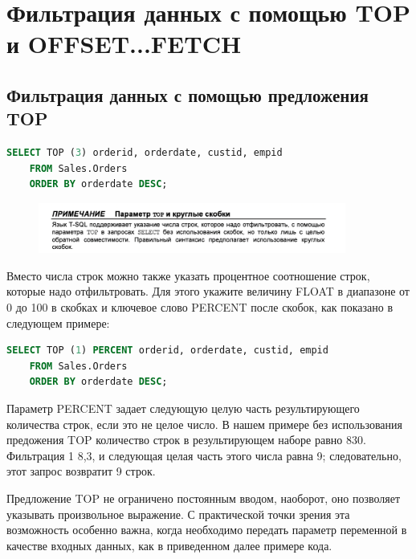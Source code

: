 \section{Фильтрация данных с помощью TOP и OFFSET...FETCH} 

\subsection{Фильтрация данных с помощью предложения TOP}

\begin{lstlisting}[label=lst:funcReturn, caption=Пример работы с TOP, language=sql]
	SELECT TOP (3) orderid, orderdate, custid, empid
	FROM Sales.Orders
	ORDER BY orderdate DESC; 
\end{lstlisting}



\begin{figure}[h!]
	\begin{center}
		\includegraphics[width=0.9\textwidth]{img/advice6.png}
	\end{center}
	\captionsetup{justification=centering}
\end{figure}

Вместо числа строк можно также указать процентное соотношение строк, которые
надо отфильтровать. Для этого укажите величину FLOAT в диапазоне от 0 до 100
в скобках и ключевое слово PERCENT после скобок, как показано в следующем примере:


\begin{lstlisting}[label=lst:funcReturn, language=sql]
	SELECT TOP (1) PERCENT orderid, orderdate, custid, empid
	FROM Sales.Orders
	ORDER BY orderdate DESC; 
\end{lstlisting}

Параметр PERCENT задает следующую целую часть результирующего количества
строк, если это не целое число. В нашем примере без использования предожения
TOP количество строк в результирующем наборе равно 830. Фильтрация 1%
8,3, и следующая целая часть этого числа равна 9; следовательно, этот запрос возвратит 9 строк. 


Предложение TOP не ограничено постоянным вводом, наоборот, оно позволяет указывать произвольное выражение. С практической точки зрения эта возможность
особенно важна, когда необходимо передать параметр переменной в качестве входных данных, как в приведенном далее примере кода. 

